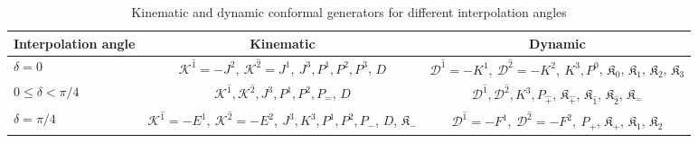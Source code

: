 \documentclass[aps,reprint,notitlepage,nofootinbib,superscriptaddress]{revtex4-1}
\newcommand{\pT}{\hat{+}}
\newcommand{\mT}{\hat{-}}
\begin{document}
\begin{table*}[t]
  \caption{\label{tab:Kinematic_and_dynamic_generators_for_different_interoplation_angles_conformal}Kinematic and dynamic conformal generators for different interpolation angles}
    \begin{ruledtabular}
       \begin{tabular}{lcc}
	Interpolation angle & Kinematic & Dynamic \\
	\hline
	\rule{0pt}{3ex} $\delta=0$ & $\mathcal{K}^{\hat{1}}=-J^{2},~ \mathcal{K}^{\hat{2}}=J^{1},~ J^{3}, P^{1}, P^{2}, P^{3}$, $D$ & $\mathcal{D}^{\hat{1}}=-K^{1},~ \mathcal{D}^{\hat{2}}=-K^{2},~ K^{3}, P^{0}$, $\mathfrak{K}_{{0}}$, $\mathfrak{K}_{{1}}$, $\mathfrak{K}_{{2}}$, $\mathfrak{K}_{{3}}$\\
	$0\leq\delta<\pi/4$ & $\mathcal{K}^{\hat{1}}, \mathcal{K}^{\hat{2}}, J^{3}, P^{1}, P^{2}, P_{\mT}$, $D$ & $\mathcal{D}^{\hat{1}}, \mathcal{D}^{\hat{2}}, K^{3}, P_{\pT}$, $\mathfrak{K}_{\hat{+}}$, $\mathfrak{K}_{\hat{1}}$, $\mathfrak{K}_{\hat{2}}$, $\mathfrak{K}_{\hat{-}}$\\
	$\delta=\pi/4$ & $\mathcal{K}^{\hat{1}}=-E^{1},~ \mathcal{K}^{\hat{2}}=-E^{2},~ J^{3}, K^{3}, P^{1}, P^{2}, P_{-}$, $D$, $\mathfrak{K}_{{-}}$& $\mathcal{D}^{\hat{1}}=-F^{1},~ \mathcal{D}^{\hat{2}}=-F^{2},~ P_{+}$, $\mathfrak{K}_{{+}}$, $\mathfrak{K}_{{1}}$, $\mathfrak{K}_{{2}}$\\
      \end{tabular}
    \end{ruledtabular}
\end{table*}
\end{document}
